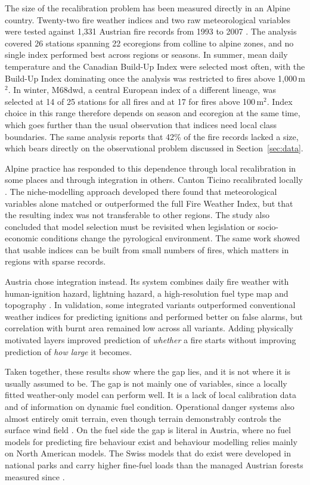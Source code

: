 \documentclass[11pt,a4paper]{article}
\begin{document}
The size of the recalibration problem has been measured directly in an Alpine country. Twenty-two fire weather indices and two raw meteorological variables were tested against 1{,}331 Austrian fire records from 1993 to 2007 \citep{arpaci_selecting_2013}. The analysis covered 26 stations spanning 22 ecoregions from colline to alpine zones, and no single index performed best across regions or seasons. In summer, mean daily temperature and the Canadian Build-Up Index were selected most often, with the Build-Up Index dominating once the analysis was restricted to fires above 1{,}000\,m$^2$. In winter, M68dwd, a central European index of a different lineage, was selected at 14 of 25 stations for all fires and at 17 for fires above 100\,m$^2$. Index choice in this range therefore depends on season and ecoregion at the same time, which goes further than the usual observation that indices need local class boundaries. The same analysis reports that 42\% of the fire records lacked a size, which bears directly on the observational problem discussed in Section~\ref{sec:data}.

Alpine practice has responded to this dependence through local recalibration in some places and through integration in others. Canton Ticino recalibrated locally \citep{de_angelis_modelling_2015}. The niche-modelling approach developed there found that meteorological variables alone matched or outperformed the full Fire Weather Index, but that the resulting index was not transferable to other regions. The study also concluded that model selection must be revisited when legislation or socio-economic conditions change the pyrological environment. The same work showed that usable indices can be built from small numbers of fires, which matters in regions with sparse records.

Austria chose integration instead. Its system combines daily fire weather with human-ignition hazard, lightning hazard, a high-resolution fuel type map and topography \citep{muller_towards_2020}. In validation, some integrated variants outperformed conventional weather indices for predicting ignitions and performed better on false alarms, but correlation with burnt area remained low across all variants. Adding physically motivated layers improved prediction of \emph{whether} a fire starts without improving prediction of \emph{how large} it becomes.

Taken together, these results show where the gap lies, and it is not where it is usually assumed to be. The gap is not mainly one of variables, since a locally fitted weather-only model can perform well. It is a lack of local calibration data and of information on dynamic fuel condition. Operational danger systems also almost entirely omit terrain, even though terrain demonstrably controls the surface wind field \citep{ozaki_impact_2022, sharples_overview_2009}. On the fuel side the gap is literal in Austria, where no fuel models for predicting fire behaviour exist and behaviour modelling relies mainly on North American models. The Swiss models that do exist were developed in national parks and carry higher fine-fuel loads than the managed Austrian forests measured since \citep{neumann_fuel_2022}.
\end{document}
